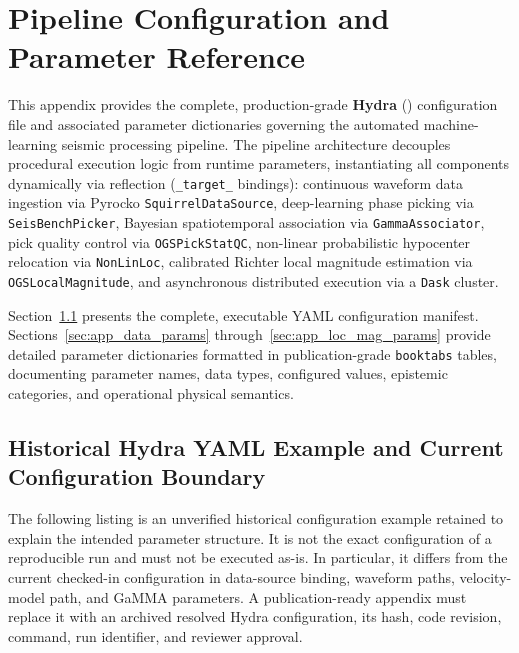 
\label{chap:appendix}

\chapter{Pipeline Configuration and Parameter Reference}
\label{units:app:config}

This appendix provides the complete, production-grade \textbf{Hydra} (\cite{Hydra}) configuration file and associated parameter dictionaries governing the automated machine-learning seismic processing pipeline. The pipeline architecture decouples procedural execution logic from runtime parameters, instantiating all components dynamically via reflection (\texttt{\_target\_} bindings): continuous waveform data ingestion via Pyrocko \texttt{SquirrelDataSource}, deep-learning phase picking via \texttt{SeisBenchPicker}, Bayesian spatiotemporal association via \texttt{GammaAssociator}, pick quality control via \texttt{OGSPickStatQC}, non-linear probabilistic hypocenter relocation via \texttt{NonLinLoc}, calibrated Richter local magnitude estimation via \texttt{OGSLocalMagnitude}, and asynchronous distributed execution via a \texttt{Dask} cluster.

Section~\ref{sec:app_yaml} presents the complete, executable YAML configuration manifest. Sections~\ref{sec:app_data_params} through~\ref{sec:app_loc_mag_params} provide detailed parameter dictionaries formatted in publication-grade \texttt{booktabs} tables, documenting parameter names, data types, configured values, epistemic categories, and operational physical semantics.

\section{Historical Hydra YAML Example and Current Configuration Boundary}
\label{sec:app_yaml}

The following listing is an unverified historical configuration example retained to explain the intended parameter structure. It is not the exact configuration of a reproducible run and must not be executed as-is. In particular, it differs from the current checked-in configuration in data-source binding, waveform paths, velocity-model path, and GaMMA parameters. A publication-ready appendix must replace it with an archived resolved Hydra configuration, its hash, code revision, command, run identifier, and reviewer approval.

